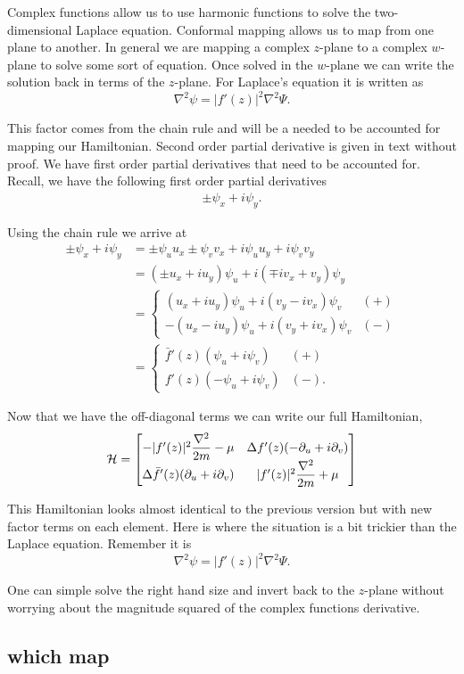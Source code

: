 Complex functions allow us to use harmonic functions to solve the two-dimensional Laplace equation.
Conformal mapping allows us to map from one plane to another.
In general we are mapping a complex $z$-plane to a complex $w$-plane to solve some sort of equation.
Once solved in the $w$-plane we can write the solution back in terms of the $z$-plane.
For Laplace's equation it is written as
\begin{equation}
  \nabla^2 \psi = |f'(z)|^2\nabla^2\Psi.
\end{equation}

This factor comes from the chain rule and will be a needed to be accounted for mapping our Hamiltonian.
Second order partial derivative is given in text without proof.
We have first order partial derivatives that need to be accounted for.
Recall, we have the following first order partial derivatives
\begin{align}
  \pm \psi_x + i \psi_y. 
\end{align}

Using the chain rule we arrive at
\begin{align}
  \pm \psi_x + i \psi_y &= \pm \psi_u u_x \pm \psi_v v_x + i \psi_u u_y + i \psi_v v_y \\
  &= (\pm u_x + i u_y) \psi_u + i(\mp i v_x + v_y) \psi_y \\
  &=
  \begin{cases}
    (u_x + i u_y) \psi_u + i (v_y - i v_x) \psi_v & (+) \\
    -(u_x - i u_y) \psi_u + i (v_y + i v_x) \psi_v & (-)
  \end{cases} \\
  &=
  \begin{cases}
    \bar{f}'(z) (\psi_u + i \psi_v) & (+) \\
    f'(z) (-\psi_u + i \psi_v) & (-).
  \end{cases}
\end{align}

Now that we have the off-diagonal terms we can write our full Hamiltonian,
\begin{align}
  \mathcal{H} = 
  \begin{bmatrix}
    -|f'(z)|^2\dfrac{\nabla^2}{2m} - \mu & \Delta f'(z) (-\partial_u + i \partial_v) \\
    \Delta \bar{f}'(z)(\partial_u +i\partial_v) & |f'(z)|^2\dfrac{\nabla^2}{2m} + \mu
  \end{bmatrix}
\end{align}

This Hamiltonian looks almost identical to the previous version but with new factor terms on each element.
Here is where the situation is a bit trickier than the Laplace equation.
Remember it is
\begin{equation}
  \nabla^2 \psi = |f'(z)|^2\nabla^2\Psi.
\end{equation}

One can simple solve the right hand size and invert back to the $z$-plane without worrying about the magnitude squared of the complex functions derivative.

\subsection{which map}

